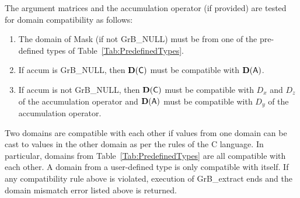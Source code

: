 The argument matrices and the accumulation 
operator (if provided) are tested for domain compatibility as follows:
\begin{enumerate}
	\item The domain of {\sf Mask} (if not {\sf GrB\_NULL}) must be from one of 
    the pre-defined types of Table~\ref{Tab:PredefinedTypes}.

	\item If {\sf accum} is {\sf GrB\_NULL}, then $\bold{D}({\sf C})$ must be 
    compatible with $\bold{D}({\sf A})$.

	\item If {\sf accum} is not {\sf GrB\_NULL}, then $\bold{D}({\sf C})$ must be
    compatible with $D_x$ and $D_z$ of the accumulation operator and 
    $\bold{D}({\sf A})$ must be compatible with $D_y$ of the accumulation operator.
\end{enumerate}
Two domains are compatible with each other if values from one domain can be cast 
to values in the other domain as per the rules of the C language.
In particular, domains from Table~\ref{Tab:PredefinedTypes} are all compatible 
with each other. A domain from a user-defined type is only compatible with itself.
If any compatibility rule above is violated, execution of {\sf GrB\_extract} ends
and the domain mismatch error listed above is returned.

